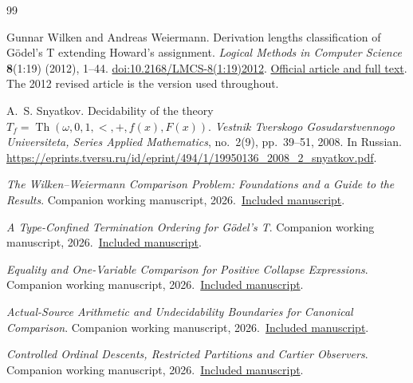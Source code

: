 \begin{thebibliography}{99}

Gunnar Wilken and Andreas Weiermann.
Derivation lengths classification of G\"odel's T extending Howard's assignment.
\emph{Logical Methods in Computer Science} \textbf{8}(1:19) (2012), 1--44.
\href{https://doi.org/10.2168/LMCS-8(1:19)2012}
{doi:10.2168/LMCS-8(1:19)2012}.
\href{https://lmcs.episciences.org/1073}{Official article and full text}.
The 2012 revised article is the version used throughout.

A.~S. Snyatkov.
Decidability of the theory
$T_f=\operatorname{Th}(\omega,0,1,<,+,f(x),F(x))$.
\emph{Vestnik Tverskogo Gosudarstvennogo Universiteta,
Series Applied Mathematics}, no.~2(9), pp.~39--51, 2008.
In Russian.
\url{https://eprints.tversu.ru/id/eprint/494/1/19950136_2008_2_snyatkov.pdf}.

\emph{The Wilken--Weiermann Comparison Problem: Foundations and a Guide to the Results}. Companion working manuscript, 2026.\
\href{../05-wilken-weiermann-foundations/paper.pdf}{Included manuscript}.

\emph{A Type-Confined Termination Ordering for G\"odel's T}. Companion working manuscript, 2026.\
\href{../06-godel-t-termination-ordering/paper.pdf}{Included manuscript}.

\bibitem{wwunivariate}\emph{Equality and One-Variable Comparison for Positive Collapse Expressions}. Companion working manuscript, 2026.\
\href{../07-collapse-equality-and-one-variable/paper.pdf}{Included manuscript}.

\bibitem{wwexpressivity}\emph{Actual-Source Arithmetic and Undecidability Boundaries for Canonical Comparison}. Companion working manuscript, 2026.\
\href{../09-canonical-source-expressivity/paper.pdf}{Included manuscript}.

\emph{Controlled Ordinal Descents, Restricted Partitions and Cartier Observers}. Companion working manuscript, 2026.\
\href{../10-collapse-descent-and-modular-counts/paper.pdf}{Included manuscript}.
\end{thebibliography}
